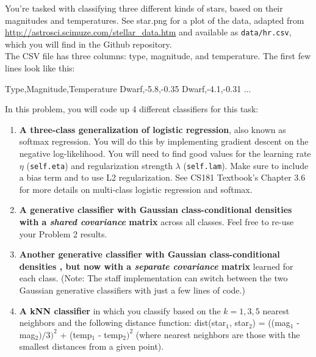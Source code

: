 \documentclass[submit]{harvardml}
\begin{document}

\begin{problem}

You're tasked with classifying three different kinds of stars, based
on their magnitudes and temperatures. See star.png for a plot of
the data, adapted from
\url{http://astrosci.scimuze.com/stellar_data.htm} and available as
\verb|data/hr.csv|, which you will find in the Github repository. \\

The CSV file has three columns: type, magnitude, and temperature. The
first few lines look like this:
\begin{csv}
Type,Magnitude,Temperature
Dwarf,-5.8,-0.35
Dwarf,-4.1,-0.31
...
\end{csv}

In this problem, you will code up 4 different classifiers for this task:
\begin{enumerate}[label=\alph*)]
\item \textbf{A three-class generalization of logistic regression}, also
  known as softmax regression. You will do this by
  implementing gradient descent on the negative log-likelihood. You
  will need to find good values for the learning rate $\eta$ (\texttt{self.eta}) and
  regularization strength $\lambda$ (\texttt{self.lam}). Make sure to include a bias term and to
  use L2 regularization. See CS181 Textbook's Chapter 3.6 for more details on multi-class
  logistic regression and softmax.
  
\item \textbf{A generative classifier with Gaussian class-conditional
  densities with a \textit{shared covariance} matrix} across all classes. 
  Feel free to re-use your Problem 2 results.
\item \textbf{Another generative classifier with Gaussian class-conditional densities , but now 
with a \textit{separate covariance} matrix} learned for each class. (Note: 
The staff implementation can switch between the two Gaussian generative classifiers with just a
few lines of code.)

\item \textbf{A kNN classifier} in which you classify based on the $k=1,3,5$ nearest neighbors and the following distance function: dist(star$_1$, star$_2$) = ((mag$_1$ - mag$_2)/3)^2$ + (temp$_1$ - temp$_2)^2$ (where nearest neighbors are those with the smallest distances from a given point). 


\end{enumerate}
\end{problem}
\end{document}
